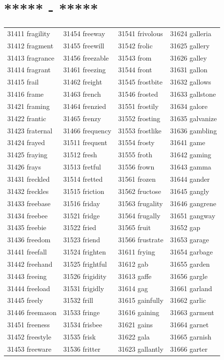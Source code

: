 \documentclass[10pt, oneside]{book}
\begin{document}
\begin{table}[h]
	\centering
	\section*{***** - *****}
	\begin{tabular}{l l l l}
31411 fragility &31454 freeway &31541 frivolous &31624 galleria\\
31412 fragment &31455 freewill &31542 frolic &31625 gallery\\
31413 fragrance &31456 freezable &31543 from &31626 galley\\
31414 fragrant &31461 freezing &31544 front &31631 gallon\\
31415 frail &31462 freight &31545 frostbite &31632 gallows\\
31416 frame &31463 french &31546 frosted &31633 gallstone\\
31421 framing &31464 frenzied &31551 frostily &31634 galore\\
31422 frantic &31465 frenzy &31552 frosting &31635 galvanize\\
31423 fraternal &31466 frequency &31553 frostlike &31636 gambling\\
31424 frayed &31511 frequent &31554 frosty &31641 game\\
31425 fraying &31512 fresh &31555 froth &31642 gaming\\
31426 frays &31513 fretful &31556 frown &31643 gamma\\
31431 freckled &31514 fretted &31561 frozen &31644 gander\\
31432 freckles &31515 friction &31562 fructose &31645 gangly\\
31433 freebase &31516 friday &31563 frugality &31646 gangrene\\
31434 freebee &31521 fridge &31564 frugally &31651 gangway\\
31435 freebie &31522 fried &31565 fruit &31652 gap\\
31436 freedom &31523 friend &31566 frustrate &31653 garage\\
31441 freefall &31524 frighten &31611 frying &31654 garbage\\
31442 freehand &31525 frightful &31612 gab &31655 garden\\
31443 freeing &31526 frigidity &31613 gaffe &31656 gargle\\
31444 freeload &31531 frigidly &31614 gag &31661 garland\\
31445 freely &31532 frill &31615 gainfully &31662 garlic\\
31446 freemason &31533 fringe &31616 gaining &31663 garment\\
31451 freeness &31534 frisbee &31621 gains &31664 garnet\\
31452 freestyle &31535 frisk &31622 gala &31665 garnish\\
31453 freeware &31536 fritter &31623 gallantly &31666 garter\\
	\end{tabular}
 \end{table}
\end{document}
